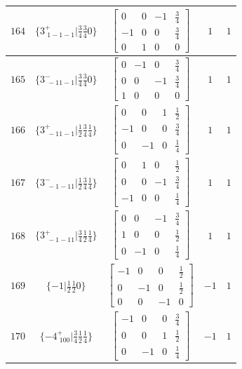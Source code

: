 \documentclass[fleqn,8pt]{jsarticle}
\begin{document}
\begin{longtable}{ccccc}
$ 164 $ & $ \{3^{+}_{\,\,1-1-1}|\frac{3}{4} \frac{3}{4} 0\} $ & $ \begin{bmatrix} 0 & 0 & -1 & \frac{3}{4} \\ -1 & 0 & 0 & \frac{3}{4} \\ 0 & 1 & 0 & 0 \end{bmatrix} $ & $ 1 $ & $ 1 $ \\ \hline
$ 165 $ & $ \{3^{-}_{\,\,-11-1}|\frac{3}{4} \frac{3}{4} 0\} $ & $ \begin{bmatrix} 0 & -1 & 0 & \frac{3}{4} \\ 0 & 0 & -1 & \frac{3}{4} \\ 1 & 0 & 0 & 0 \end{bmatrix} $ & $ 1 $ & $ 1 $ \\ \hline
$ 166 $ & $ \{3^{+}_{\,\,-11-1}|\frac{1}{2} \frac{3}{4} \frac{1}{4}\} $ & $ \begin{bmatrix} 0 & 0 & 1 & \frac{1}{2} \\ -1 & 0 & 0 & \frac{3}{4} \\ 0 & -1 & 0 & \frac{1}{4} \end{bmatrix} $ & $ 1 $ & $ 1 $ \\ \hline
$ 167 $ & $ \{3^{-}_{\,\,-1-11}|\frac{1}{2} \frac{3}{4} \frac{1}{4}\} $ & $ \begin{bmatrix} 0 & 1 & 0 & \frac{1}{2} \\ 0 & 0 & -1 & \frac{3}{4} \\ -1 & 0 & 0 & \frac{1}{4} \end{bmatrix} $ & $ 1 $ & $ 1 $ \\ \hline
$ 168 $ & $ \{3^{+}_{\,\,-1-11}|\frac{3}{4} \frac{1}{2} \frac{1}{4}\} $ & $ \begin{bmatrix} 0 & 0 & -1 & \frac{3}{4} \\ 1 & 0 & 0 & \frac{1}{2} \\ 0 & -1 & 0 & \frac{1}{4} \end{bmatrix} $ & $ 1 $ & $ 1 $ \\ \hline
$ 169 $ & $ \{-1|\frac{1}{2} \frac{1}{2} 0\} $ & $ \begin{bmatrix} -1 & 0 & 0 & \frac{1}{2} \\ 0 & -1 & 0 & \frac{1}{2} \\ 0 & 0 & -1 & 0 \end{bmatrix} $ & $ -1 $ & $ 1 $ \\ \hline
$ 170 $ & $ \{-4^{+}_{\,\,100}|\frac{3}{4} \frac{1}{2} \frac{1}{4}\} $ & $ \begin{bmatrix} -1 & 0 & 0 & \frac{3}{4} \\ 0 & 0 & 1 & \frac{1}{2} \\ 0 & -1 & 0 & \frac{1}{4} \end{bmatrix} $ & $ -1 $ & $ 1 $ \\ \hline

\end{longtable}
\end{document}
